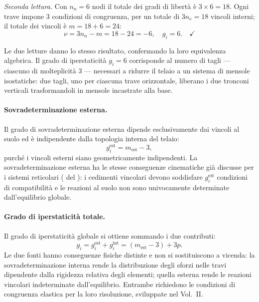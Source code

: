 \noindent\textit{Seconda lettura.}
Con $n_n = 6$ nodi il totale dei gradi di libertà
è $3 \times 6 = 18$. Ogni trave impone $3$ condizioni
di congruenza, per un totale di $3n_e = 18$ vincoli
interni; il totale dei vincoli è
$m = 18 + 6 = 24$:
\[
\nu = 3n_n - m = 18 - 24 = -6,
\quad g_i = 6. \quad\checkmark
\]

Le due letture danno lo stesso risultato,
confermando la loro equivalenza algebrica.
Il grado di iperstaticità $g_i = 6$ corrisponde
al numero di tagli --- ciascuno di molteplicità $3$
--- necessari a ridurre il telaio a un sistema
di mensole isostatiche: due tagli, uno per ciascuna
trave orizzontale, liberano i due tronconi verticali
trasformandoli in mensole incastrate alla base.





\paragraph{Sovradeterminazione esterna.}
Il grado di sovradeterminazione esterna dipende
esclusivamente dai vincoli al suolo ed è indipendente
dalla topologia interna del telaio:
\begin{equation}\label{eq:g_est_telaio}
	g_i^{\text{est}} = m_{\text{est}} - 3,
\end{equation}
purché i vincoli esterni siano geometricamente
indipendenti. La sovradeterminazione esterna ha
le stesse conseguenze cinematiche già discusse
per i sistemi reticolari
(
del ): i cedimenti
vincolari devono soddisfare $g_i^{\text{est}}$
condizioni di compatibilità e le reazioni al suolo
non sono univocamente determinate dall'equilibrio
globale.

\paragraph{Grado di iperstaticità totale.}
Il grado di iperstaticità globale si ottiene
sommando i due contributi:
\begin{equation}\label{eq:g_tot_telaio}
	g_i = g_i^{\text{est}} + g_i^{\text{int}}
	= (m_{\text{est}} - 3) + 3p.
\end{equation}
Le due fonti hanno conseguenze fisiche distinte
e non si sostituiscono a vicenda: la
sovradeterminazione interna rende la distribuzione
degli sforzi nelle travi dipendente dalla rigidezza
relativa degli elementi; quella esterna rende le
reazioni vincolari indeterminate dall'equilibrio.
Entrambe richiedono le condizioni di congruenza
elastica per la loro risoluzione, sviluppate
nel Vol.~II.

